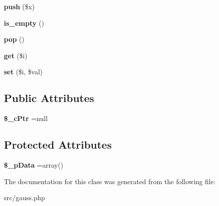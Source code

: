 \begin{DoxyCompactItemize}
\item 
\hypertarget{class_string_string_vector_adb72d41b06d27d60678d8d654111fdee}{{\bfseries push} (\$x)}\label{class_string_string_vector_adb72d41b06d27d60678d8d654111fdee}

\item 
\hypertarget{class_string_string_vector_a63a9fd36db8258924c7524e76334dd2d}{{\bfseries is\-\_\-empty} ()}\label{class_string_string_vector_a63a9fd36db8258924c7524e76334dd2d}

\item 
\hypertarget{class_string_string_vector_a0e17494fc9e35a63c4da1cc15034fd01}{{\bfseries pop} ()}\label{class_string_string_vector_a0e17494fc9e35a63c4da1cc15034fd01}

\item 
\hypertarget{class_string_string_vector_a367a59fc3255124da20a6ed4a1997af2}{{\bfseries get} (\$i)}\label{class_string_string_vector_a367a59fc3255124da20a6ed4a1997af2}

\item 
\hypertarget{class_string_string_vector_a1a4bece7599d597bb06c9d5ab397972c}{{\bfseries set} (\$i, \$val)}\label{class_string_string_vector_a1a4bece7599d597bb06c9d5ab397972c}

\end{DoxyCompactItemize}
\subsection*{Public Attributes}
\begin{DoxyCompactItemize}
\item 
\hypertarget{class_string_string_vector_abe63acbb5741264ff4d70274497b4dc8}{{\bfseries \$\-\_\-c\-Ptr} =null}\label{class_string_string_vector_abe63acbb5741264ff4d70274497b4dc8}

\end{DoxyCompactItemize}
\subsection*{Protected Attributes}
\begin{DoxyCompactItemize}
\item 
\hypertarget{class_string_string_vector_a10f6b72cb95cdf4d0bc26c029c4a14fe}{{\bfseries \$\-\_\-p\-Data} =array()}\label{class_string_string_vector_a10f6b72cb95cdf4d0bc26c029c4a14fe}

\end{DoxyCompactItemize}


The documentation for this class was generated from the following file\-:\begin{DoxyCompactItemize}
\item 
src/gauss.\-php\end{DoxyCompactItemize}
